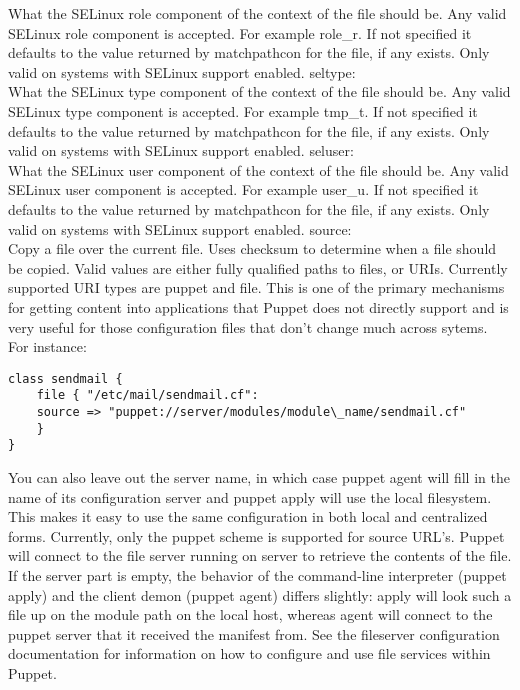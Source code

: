 {What the SELinux role component of the context of the file should be. Any valid SELinux role component is accepted. For example role\_r. If not specified it defaults to the value returned by matchpathcon for the file, if any exists. Only valid on systems with SELinux support enabled.
%
seltype:\\
What the SELinux type component of the context of the file should be. Any valid SELinux type component is accepted. For example tmp\_t. If not specified it defaults to the value returned by matchpathcon for the file, if any exists. Only valid on systems with SELinux support enabled.
%
seluser:\\
What the SELinux user component of the context of the file should be. Any valid SELinux user component is accepted. For example user\_u. If not specified it defaults to the value returned by matchpathcon for the file, if any exists. Only valid on systems with SELinux support enabled.
%
source:\\
Copy a file over the current file. Uses checksum to determine when a file should be copied. Valid values are either fully qualified paths to files, or URIs. Currently supported URI types are puppet and file.
%
This is one of the primary mechanisms for getting content into applications that Puppet does not directly support and is very useful for those configuration files that don't change much across sytems. For instance:
%
\begin{code}
\begin{lstlisting}
class sendmail {
	file { "/etc/mail/sendmail.cf":
	source => "puppet://server/modules/module\_name/sendmail.cf"
	}
}
\end{lstlisting}
\end{code}
%
You can also leave out the server name, in which case puppet agent will fill in the name of its configuration server and puppet apply will use the local filesystem. This makes it easy to use the same configuration in both local and centralized forms.
%
Currently, only the puppet scheme is supported for source URL's. Puppet will connect to the file server running on server to retrieve the contents of the file. If the server part is empty, the behavior of the command-line interpreter (puppet apply) and the client demon (puppet agent) differs slightly: apply will look such a file up on the module path on the local host, whereas agent will connect to the puppet server that it received the manifest from.
%
See the fileserver configuration documentation for information on how to configure and use file services within Puppet.
}
